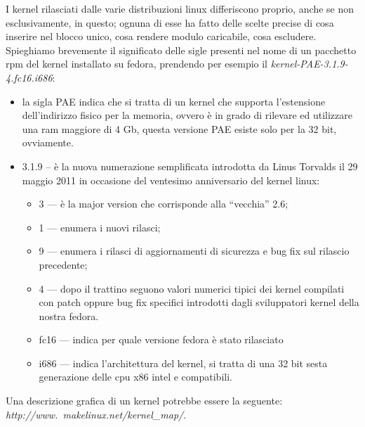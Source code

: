 I kernel rilasciati dalle varie distribuzioni linux differiscono proprio, anche se non esclusivamente, in questo; ognuna di esse ha fatto delle scelte precise di cosa inserire nel blocco unico, cosa rendere modulo caricabile, cosa escludere.\\

Spieghiamo brevemente il significato delle sigle presenti nel nome di un pacchetto rpm del kernel installato su fedora, prendendo per esempio il {\itshape kernel-PAE-3.1.9-4.fc16.i686}:

\begin{itemize}
\item la sigla PAE indica che si tratta di un kernel che supporta l'estensione dell'indirizzo fisico per la memoria, ovvero è in grado di rilevare ed utilizzare una ram maggiore di 4 Gb, questa versione PAE esiste solo per la 32 bit, ovviamente.
\item 3.1.9 – è la nuova numerazione semplificata introdotta da Linus Torvalds il 29 maggio 2011 in occasione del ventesimo anniversario del kernel linux:
\begin{itemize}
\item 3 --- è la major version che corrisponde alla “vecchia” 2.6;
\item 1 --- enumera i nuovi rilasci;
\item 9 --- enumera i rilasci di aggiornamenti di sicurezza e bug fix sul rilascio precedente;
\item 4 --- dopo il trattino seguono valori numerici tipici dei kernel compilati con patch oppure bug fix specifici introdotti dagli sviluppatori kernel della nostra fedora.
\item fc16 --- indica per quale versione fedora è stato rilasciato
\item i686 --- indica l'architettura del kernel, si tratta di una 32 bit sesta generazione delle cpu x86 intel e compatibili.
\end{itemize}
\end{itemize}

Una descrizione grafica di un kernel potrebbe essere la seguente:
{\itshape http://www.\ makelinux.net/kernel\_map/}.\\

